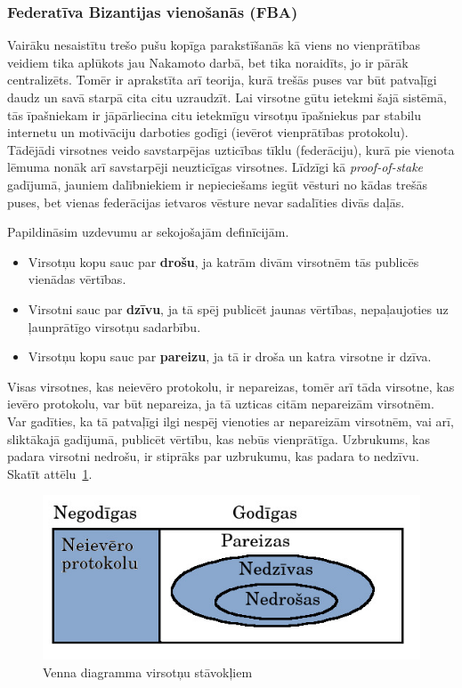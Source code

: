 \subsubsection{Federatīva Bizantijas vienošanās (FBA)}
Vairāku nesaistītu trešo pušu kopīga parakstīšanās kā viens no vienprātības veidiem tika aplūkots jau Nakamoto darbā\cite{nakamoto08}, bet tika noraidīts, jo ir pārāk centralizēts. Tomēr ir aprakstīta arī teorija, kurā trešās puses var būt patvaļīgi daudz un savā starpā cita citu uzraudzīt.\cite{mazieres15}
Lai virsotne gūtu ietekmi šajā sistēmā, tās īpašniekam ir jāpārliecina citu ietekmīgu virsotņu īpašniekus par stabilu internetu un motivāciju darboties godīgi (ievērot vienprātības protokolu). Tādējādi virsotnes veido savstarpējas uzticības tīklu (federāciju), kurā pie vienota lēmuma nonāk arī savstarpēji neuzticīgas virsotnes. Līdzīgi kā \textit{proof-of-stake} gadījumā, jauniem dalībniekiem ir nepieciešams iegūt vēsturi no kādas trešās puses, bet vienas federācijas ietvaros vēsture nevar sadalīties divās daļās.

Papildināsim uzdevumu ar sekojošajām definīcijām.
\begin{itemize}
    \item Virsotņu kopu sauc par \textbf{drošu}, ja katrām divām virsotnēm tās publicēs vienādas vērtības.
    \item Virsotni sauc par \textbf{dzīvu}, ja tā spēj publicēt jaunas vērtības, nepaļaujoties uz ļaunprātīgo virsotņu sadarbību.
    \item Virsotņu kopu sauc par \textbf{pareizu}, ja tā ir droša un katra virsotne ir dzīva.
\end{itemize}
Visas virsotnes, kas neievēro protokolu, ir nepareizas, tomēr arī tāda virsotne, kas ievēro protokolu, var būt nepareiza, ja tā uzticas citām nepareizām virsotnēm. Var gadīties, ka tā patvaļīgi ilgi nespēj vienoties ar nepareizām virsotnēm, vai arī, sliktākajā gadījumā, publicēt vērtību, kas nebūs vienprātīga. Uzbrukums, kas padara virsotni nedrošu, ir stiprāks par uzbrukumu, kas padara to nedzīvu. Skatīt attēlu~\ref{fig:node-fail}.
\begin{figure}[htpb]
    \centering
    \includegraphics[scale=0.5]{teorija/node-fail.jpg}
    \caption{Venna diagramma virsotņu stāvokļiem}
\label{fig:node-fail}
\end{figure}

